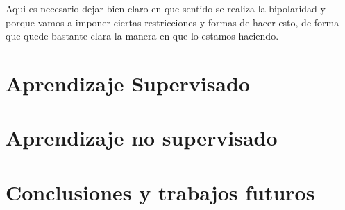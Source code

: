 \documentclass[letterpaper,11pt]{article}
\begin{document}
Aqui es necesario dejar bien claro en que sentido se realiza la
bipolaridad y porque vamos a imponer ciertas restricciones y formas de
hacer esto, de forma que quede bastante clara la manera en que lo
estamos haciendo.

\section{Aprendizaje Supervisado}
\label{sec:aprend-superv}

\section{Aprendizaje no supervisado}
\label{sec:aprend-no-superv}

\section{Conclusiones y trabajos futuros}
\label{sec:concl-y-trab}
\end{document}
